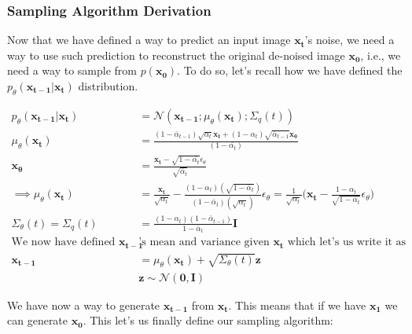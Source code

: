 \documentclass{article}
\begin{document}
\subsubsection{Sampling Algorithm Derivation}


Now that we have defined a way to predict an input image $\mathbf{x_t}$'s noise, we need a way to use such prediction to reconstruct the original de-noised image $\mathbf{x_0}$, i.e., we need a way to sample from $p(\mathbf{x_0})$. To do so, let's recall how we have defined the $p_\theta (\mathbf{x_{t-1} | x_t})$ distribution.


\begin{align}
	p_\theta(\mathbf{x_{t-1} | x_t}) &=   \mathcal{N}(\mathbf{x_{t-1}};  \mu_\theta(\mathbf{x_t}); \Sigma_q(t)) \\
	 \mu_\theta(\mathbf{x_t}) 	 &= \frac{(1-\bar{\alpha}_{t-1})\sqrt{\alpha_t} \mathbf{x_t} + (1- \alpha_t) \sqrt{\bar{\alpha}_{t-1}  } \mathbf{x_\theta}}{(1-\bar{\alpha_t})}\\
	 \mathbf{x_\theta}  &= \frac{\mathbf{x_t} -  \sqrt{1-\bar{\alpha_t}}\epsilon_\theta}{\sqrt{\bar\alpha_t}} \\
	 \implies  \mu_\theta(\mathbf{x_t}) &= \frac{\mathbf{x_t}}{\sqrt{\alpha_t}} - \frac{(1-\alpha_t)(\sqrt{1-\bar\alpha_t})}{(1-\bar\alpha_t)(\sqrt{\alpha_t})} \epsilon_\theta  = \frac{1}{\sqrt{\alpha_t}}\bigg( \mathbf{x_t} - \frac{1-\alpha_t}{\sqrt{1-\bar{\alpha_t}}}\epsilon_\theta\bigg) \\
	 \Sigma_\theta (t) = \Sigma_q(t) &= \frac{(1-\alpha_t)(1-\bar{\alpha}_{t-1})}{1 - \bar{\alpha}_t}  \mathbf{I} \\
	 \text{We now have defined   } \mathbf{x_{t-1}} &\text{'s mean and variance given   } \mathbf{x_t} \text{  which let's us write it as } \\
	 \mathbf{x_{t-1}} &= \mu_\theta(\mathbf{x_t}) + \sqrt{\Sigma_\theta(t)} \mathbf{z} \\
	 &\mathbf{z \sim \mathcal{N}(0, I)}	 
\end{align}

We have now a way to generate $\mathbf{x_{t-1}}$ from $\mathbf{x_t}$. This means that if we have $\mathbf{x_1}$ we can generate $\mathbf{x_0}$. This let's us finally define our sampling algorithm:
\end{document}
